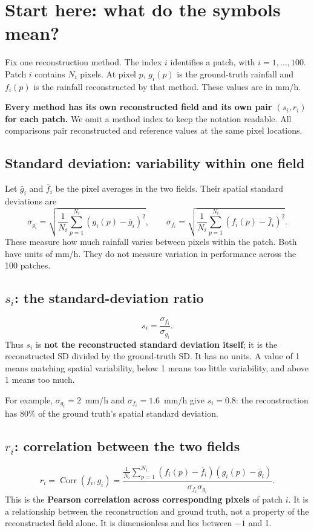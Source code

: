 \documentclass[11pt,a4paper]{article}
\newcommand{\Corr}{\operatorname{Corr}}
\begin{document}
\newpage
\section*{Start here: what do the symbols mean?}

Fix one reconstruction method. The index $i$ identifies a patch, with $i=1,\ldots,100$. Patch $i$ contains $N_i$ pixels. At pixel $p$, $g_i(p)$ is the ground-truth rainfall and $f_i(p)$ is the rainfall reconstructed by that method. These values are in mm/h.

\textbf{Every method has its own reconstructed field and its own pair $(s_i,r_i)$ for each patch.} We omit a method index to keep the notation readable. All comparisons pair reconstructed and reference values at the same pixel locations.

\subsection*{Standard deviation: variability within one field}
Let $\bar g_i$ and $\bar f_i$ be the pixel averages in the two fields. Their spatial standard deviations are
\[
\sigma_{g_i}=\sqrt{\frac1{N_i}\sum_{p=1}^{N_i}(g_i(p)-\bar g_i)^2},\qquad
\sigma_{f_i}=\sqrt{\frac1{N_i}\sum_{p=1}^{N_i}(f_i(p)-\bar f_i)^2}.
\]
These measure how much rainfall varies between pixels within the patch. Both have units of mm/h. They do not measure variation in performance across the 100 patches.

\subsection*{$s_i$: the standard-deviation ratio}
\[
\boxed{s_i=\frac{\sigma_{f_i}}{\sigma_{g_i}}.}
\]
Thus $s_i$ is \textbf{not the reconstructed standard deviation itself}; it is the reconstructed SD divided by the ground-truth SD. It has no units. A value of 1 means matching spatial variability, below 1 means too little variability, and above 1 means too much.

For example, $\sigma_{g_i}=2$~mm/h and $\sigma_{f_i}=1.6$~mm/h give $s_i=0.8$: the reconstruction has 80\% of the ground truth's spatial standard deviation.

\subsection*{$r_i$: correlation between the two fields}
\[
\boxed{r_i=\Corr(f_i,g_i)=
\frac{\frac1{N_i}\sum_{p=1}^{N_i}(f_i(p)-\bar f_i)(g_i(p)-\bar g_i)}
{\sigma_{f_i}\sigma_{g_i}}.}
\]
This is the \textbf{Pearson correlation across corresponding pixels} of patch $i$. It is a relationship between the reconstruction and ground truth, not a property of the reconstructed field alone. It is dimensionless and lies between $-1$ and 1.
\end{document}

